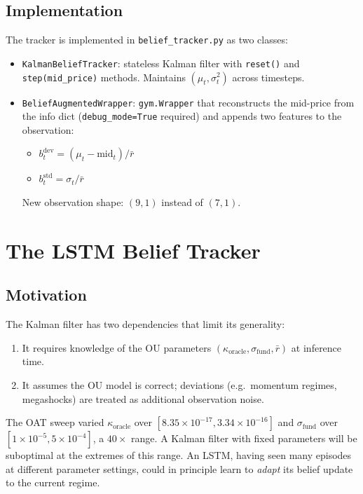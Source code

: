 \documentclass[11pt]{article}
\begin{document}
\subsection{Implementation}

The tracker is implemented in \texttt{belief\_tracker.py} as two classes:
\begin{itemize}[leftmargin=1.5em]
  \item \texttt{KalmanBeliefTracker}: stateless Kalman filter with
    \texttt{reset()} and \texttt{step(mid\_price)} methods.
    Maintains $(\mu_t, \sigma^2_t)$ across timesteps.
  \item \texttt{BeliefAugmentedWrapper}: \texttt{gym.Wrapper} that
    reconstructs the mid-price from the info dict (\texttt{debug\_mode=True}
    required) and appends two features to the observation:
    \begin{itemize}
      \item $b_t^{\text{dev}} = (\mu_t - \text{mid}_t)/\bar{r}$
      \item $b_t^{\text{std}} = \sigma_t / \bar{r}$
    \end{itemize}
    New observation shape: $(9, 1)$ instead of $(7, 1)$.
\end{itemize}

\section{The LSTM Belief Tracker}

\subsection{Motivation}

The Kalman filter has two dependencies that limit its generality:
\begin{enumerate}[leftmargin=1.5em]
  \item It requires knowledge of the OU parameters $(\kappa_{\text{oracle}},
    \sigma_{\text{fund}}, \bar{r})$ at inference time.
  \item It assumes the OU model is correct; deviations (e.g.\ momentum
    regimes, megashocks) are treated as additional observation noise.
\end{enumerate}
The OAT sweep varied $\kappa_{\text{oracle}}$ over $[8.35\times10^{-17},
3.34\times10^{-16}]$ and $\sigma_{\text{fund}}$ over $[1\times10^{-5},
5\times10^{-4}]$, a $40\times$ range.
A Kalman filter with fixed parameters will be suboptimal at the extremes of
this range.
An LSTM, having seen many episodes at different parameter settings, could in
principle learn to \emph{adapt} its belief update to the current regime.
\end{document}
